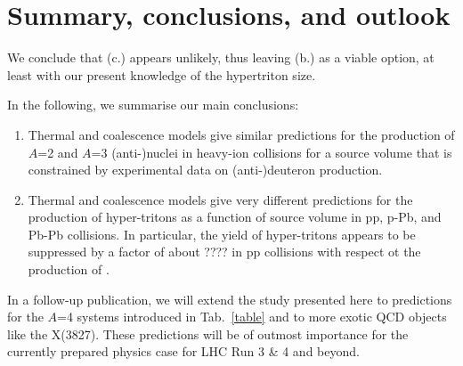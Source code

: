 \documentclass[a4paper,11pt]{scrartcl} %
\begin{document}

\section{Summary, conclusions, and outlook}

We conclude that (c.) appears unlikely, thus leaving (b.) as a viable option, at least with our present knowledge of the hypertriton size.

In the following, we summarise our main conclusions:
\begin{enumerate}
	\item Thermal and coalescence models give similar predictions for the production of $A$=2 and $A$=3 (anti-)nuclei in heavy-ion collisions for a source volume that is constrained by experimental data on (anti-)deuteron production.
	\item Thermal and coalescence models give very different predictions for the production of hyper-tritons as a function of source volume in pp, p-Pb, and Pb-Pb collisions. In particular, the yield of hyper-tritons appears to be suppressed by a factor of about ???? in pp collisions with respect ot the production of \hethree.
\end{enumerate}

In a follow-up publication, we will extend the study presented here to predictions for the $A$=4 systems introduced in Tab.~\ref{table} and to more exotic QCD objects like the X(3827). These predictions will be of outmost importance for the currently prepared physics case for LHC Run 3 \& 4 and beyond.

\end{document}

